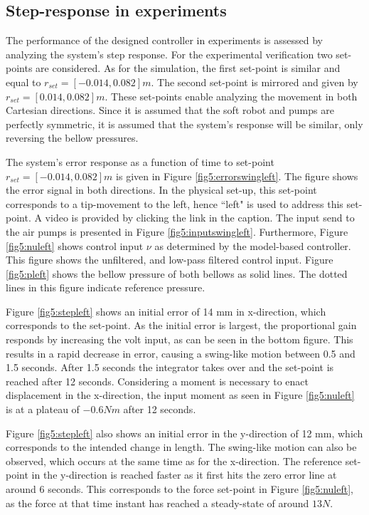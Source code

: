 \subsection*{Step-response in experiments}


The performance of the designed controller in experiments is assessed by analyzing the system's step response. For the experimental verification two set-points are considered. As for the simulation, the first set-point is similar and equal to $r_{set} = [-0.014,0.082] m$. The second set-point is mirrored and given by $r_{set} = [0.014,0.082] m$. These set-points enable analyzing the movement in both Cartesian directions. Since it is assumed that the soft robot and pumps are perfectly symmetric, it is assumed that the system's response will be similar, only reversing the bellow pressures.

The system's error response as a function of time to set-point $r_{set} = [-0.014,0.082] m$ is given in Figure \ref{fig5:errorswingleft}. The figure shows the error signal in both directions. In the physical set-up, this set-point corresponds to a tip-movement to the left, hence ``left"  is used to address this set-point. A video is provided by clicking the link in the caption. The input send to the air pumps is presented in Figure \ref{fig5:inputswingleft}. Furthermore, Figure \ref{fig5:nuleft} shows control input $\nu$ as determined by the model-based controller. This figure shows the unfiltered, and low-pass filtered control input. Figure \ref{fig5:pleft} shows the bellow pressure of both bellows as solid lines. The dotted lines in this figure indicate reference pressure.


Figure \ref{fig5:stepleft} shows an initial error of 14 mm in x-direction, which corresponds to the set-point. As the initial error is largest, the proportional gain responds by increasing the volt input, as can be seen in the bottom figure. This results in a rapid decrease in error, causing a swing-like motion between 0.5 and 1.5 seconds. After 1.5 seconds the integrator takes over and the set-point is reached after 12 seconds. Considering a moment is necessary to enact displacement in the x-direction, the input moment as seen in Figure \ref{fig5:nuleft} is at a plateau of $-0.6 Nm$ after 12 seconds. 

Figure \ref{fig5:stepleft} also shows an initial error in the y-direction of 12 mm, which corresponds to the intended change in length. The swing-like motion can also be observed, which occurs at the same time as for the x-direction. The reference set-point in the y-direction is reached faster as it first hits the zero error line at around 6 seconds. This corresponds to the force set-point in Figure \ref{fig5:nuleft}, as the force at that time instant has reached a steady-state of around $13N$. 

